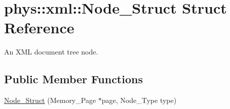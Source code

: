 \hypertarget{structphys_1_1xml_1_1Node__Struct}{
\section{phys::xml::Node\_\-Struct Struct Reference}
\label{d5/d9c/structphys_1_1xml_1_1Node__Struct}
}


An XML document tree node.  


\subsection*{Public Member Functions}
\begin{DoxyCompactItemize}
\item 
\hyperlink{structphys_1_1xml_1_1Node__Struct_ac271374fd2e6786c3eb4ee7df1e6128a}{Node\_\-Struct} (Memory\_\-Page $\ast$page, Node\_\-Type type)
\end{DoxyCompactItemize}
